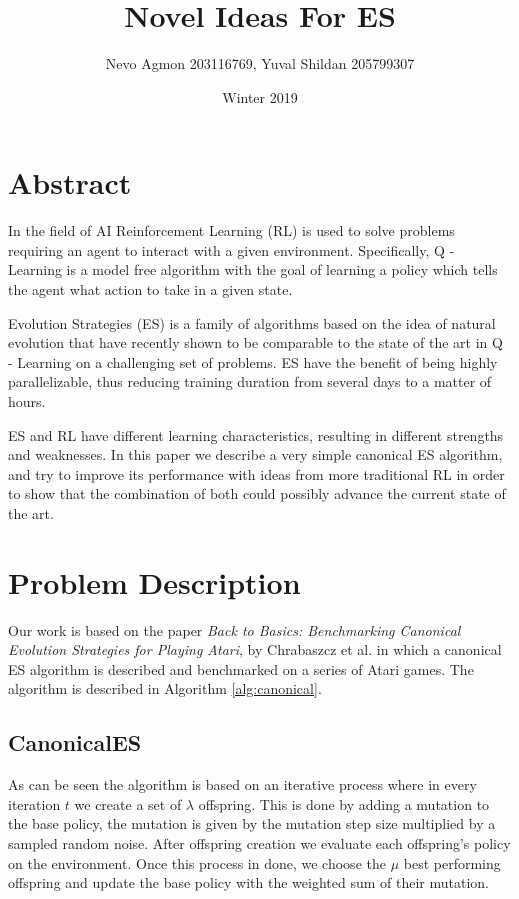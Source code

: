 \documentclass[11 pt, twocolumn]{article}
\title{Novel Ideas For ES}
\author{Nevo Agmon 203116769, Yuval Shildan 205799307}
\date{Winter 2019}
\begin{document}
\maketitle
\section{Abstract}
In the field of AI Reinforcement Learning (RL) is used to solve problems requiring an agent to interact with a given environment. Specifically, Q - Learning is a model free algorithm with the goal of learning a policy which tells the agent what action to take in a given state.

Evolution Strategies (ES) is a family of algorithms based on the idea of natural evolution that have recently shown to be comparable to the state of the art in Q - Learning on a challenging set of problems. ES have the benefit of being highly parallelizable, thus reducing training duration from several days to a matter of hours.

ES and RL have different learning characteristics, resulting in different strengths and weaknesses. In this paper we describe a very simple canonical ES algorithm, and try to improve its performance with ideas from more traditional RL in order to show that the combination of both could possibly advance the current state of the art.


\section{Problem Description}
Our work is based on the paper \emph{Back to Basics: Benchmarking Canonical Evolution Strategies for  Playing Atari}, by Chrabaszcz et al. \cite{canonical} in which a canonical ES algorithm is described and benchmarked on a series of Atari games. The algorithm is described in Algorithm \ref{alg:canonical}.

\subsection{CanonicalES}
As can be seen the algorithm is based on an iterative process where in every iteration $t$ we create a set of $\lambda$ offspring. This is done by adding a mutation to the base policy, the mutation is given by the mutation step size multiplied by a sampled random noise. After offspring creation we evaluate each offspring's policy on the environment. Once this process in done, we choose the $\mu$ best performing offspring and update the base policy with the weighted sum of their mutation.
\end{document}
